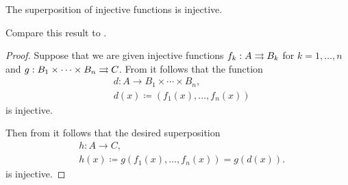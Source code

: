 \begin{proposition}\label{thm:function_superposition_invertibility}
  The superposition of injective functions is injective.
\end{proposition}
\begin{comments}
  \item Compare this result to .
\end{comments}
\begin{proof}
  Suppose that we are given injective functions \( f_k: A \rightrightarrows B_k \) for \( k = 1, \ldots, n \) and \( g: B_1 \times \cdots \times B_n \rightrightarrows C \). From  it follows that the function
  \begin{equation*}
    \begin{aligned}
      &d: A \to B_1 \times \cdots \times B_n, \\
      &d(x) \coloneqq (f_1(x), \ldots, f_n(x))
    \end{aligned}
  \end{equation*}
  is injective.

  Then from  it follows that the desired superposition
  \begin{equation*}
    \begin{aligned}
      &h: A \to C, \\
      &h(x) \coloneqq g(f_1(x), \ldots, f_n(x)) = g(d(x)).
    \end{aligned}
  \end{equation*}
  is injective.
\end{proof}

